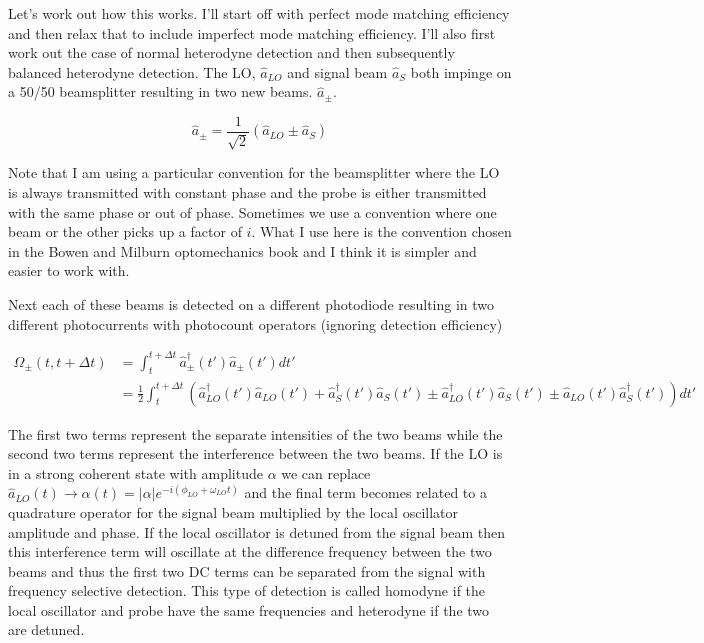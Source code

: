 \documentclass[12pt]{article}
\begin{document}
Let's work out how this works. I'll start off with perfect mode matching efficiency and then relax that to include imperfect mode matching efficiency. I'll also first work out the case of normal heterodyne detection and then subsequently balanced heterodyne detection. The LO, $\hat{a}_{LO}$ and signal beam $\hat{a}_{S}$  both impinge on a 50/50 beamsplitter resulting in two new beams. $\hat{a}_{\pm}$.

\begin{equation}
\hat{a}_{\pm} = \frac{1}{\sqrt{2}}\left(\hat{a}_{LO} \pm \hat{a}_{S}\right)
\end{equation}

Note that I am using a particular convention for the beamsplitter where the LO is always transmitted with constant phase and the probe is either transmitted with the same phase or out of phase. Sometimes we use a convention where one beam or the other picks up a factor of $i$. What I use here is the convention chosen in the Bowen and Milburn optomechanics book and I think it is simpler and easier to work with.

Next each of these beams is detected on a different photodiode resulting in two different photocurrents with photocount operators (ignoring detection efficiency)

\begin{align}
\hat{\Omega}_{\pm}(t,t+\Delta t) &= \int_t^{t+\Delta t} \hat{a}^{\dag}_{\pm}(t') \hat{a}_{\pm}(t') dt'\\
&= \frac{1}{2} \int_t^{t+\Delta t} \left( \hat{a}^{\dag}_{LO}(t') \hat{a}_{LO}(t') + \hat{a}^{\dag}_{S}(t')\hat{a}_{S}(t') \pm \hat{a}^{\dag}_{LO}(t')\hat{a}_S(t') \pm \hat{a}_{LO}(t')\hat{a}^{\dag}_S(t')\right) dt'
\end{align}

The first two terms represent the separate intensities of the two beams while the second two terms represent the interference between the two beams. If the LO is in a strong coherent state with amplitude $\alpha$ we can replace $\hat{a}_{LO}(t)\rightarrow \alpha(t) = |\alpha| e^{-i(\phi_{LO} + \omega_{LO} t)}$ and the final term becomes related to a quadrature operator for the signal beam multiplied by the local oscillator amplitude and phase. If the local oscillator is detuned from the signal beam then this interference term will oscillate at the difference frequency between the two beams and thus the first two DC terms can be separated from the signal with frequency selective detection. This type of detection is called homodyne if the local oscillator and probe have the same frequencies and heterodyne if the two are detuned.
\end{document}
